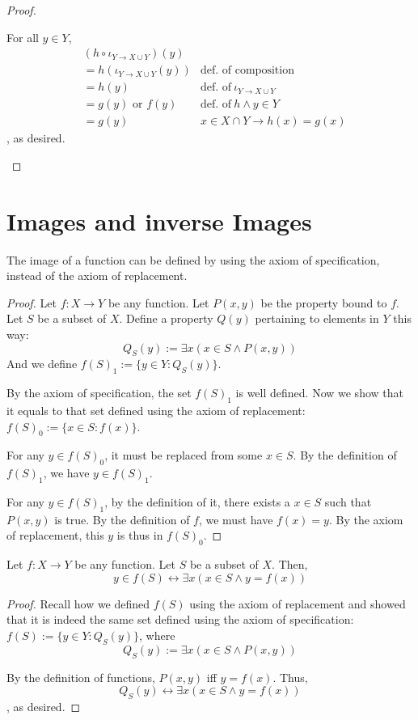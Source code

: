 \begin{proof}
\begin{enumerate}
\begin{enumerate}
			For all $y \in Y$, 
			\begin{align*}
				&(h \circ \iota_{Y \to X \cup Y})(y) \\
				&= h(\iota_{Y \to X \cup Y}(y)) 	&\text{def.~of composition}\\
				&= h(y) 							&\text{def.~of}\ \iota_{Y \to X \cup Y}\\
				&= g(y) \text{ or } f(y)			&\text{def.~of}\ h \wedge y \in Y\\
				&= g(y)								&x \in X \cap Y \to h(x) = g(x)
			\end{align*}
			, as desired.
		\end{enumerate}
	\end{enumerate}
\end{proof}

\section{Images and inverse Images}
\begin{why}{47}
	The image of a function can be defined by using the axiom of specification, instead of the axiom of replacement.
\end{why}
\begin{proof}
	Let $f: X \to Y$ be any function. Let $P(x,y)$ be the property bound to $f$. Let $S$ be a subset of $X$. Define a property $Q(y)$ pertaining to elements in $Y$ this way:
	\[
	Q_S(y) := \exists x (x \in S \wedge P(x,y))
	\]
	And we define $f(S)_1 := \{y \in Y : Q_S(y)\}$.
	
	By the axiom of specification, the set $f(S)_1$ is well defined. Now we show that it equals to that set defined using the axiom of replacement: $f(S)_0 := \{x \in S : f(x)\}$.
	
	For any $y \in f(S)_0$, it must be replaced from some $x \in S$. By the definition of $f(S)_1$, we have $y \in f(S)_1$.
	
	For any $y \in f(S)_1$, by the definition of it, there exists a $x \in S$ such that $P(x,y)$ is true. By the definition of $f$, we must have $f(x) = y$. By the axiom of replacement, this $y$ is thus in $f(S)_0$.
\end{proof}

\begin{why}{48}
	Let $f: X \to Y$ be any function. Let $S$ be a subset of $X$. Then,
	\[
	y \in f(S) \leftrightarrow \exists x (x \in S \wedge y = f(x))
	\]
\end{why}
\begin{proof}
	Recall how we defined $f(S)$ using the axiom of replacement and showed that it is indeed the same set defined using the axiom of specification: $f(S) := \{y \in Y : Q_S(y)\}$, where
	\[
		Q_S(y) := \exists x (x \in S \wedge P(x,y))
	\]
	
	By the definition of functions, $P(x,y)$ iff $y = f(x)$. Thus,
	\[
		Q_S(y) \leftrightarrow \exists x (x \in S \wedge y = f(x))
	\]
	, as desired.
\end{proof}

